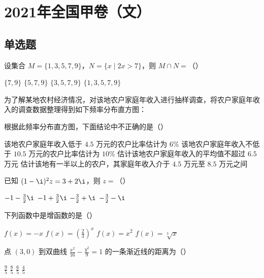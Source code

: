 \chapter{2021年全国甲卷（文）}

\section{单选题}

\begin{problem}
设集合 \(M=\{1,3,5,7,9\}\)，\(N=\{x\mid 2x>7\}\)，则 \(M\cap N=\)（\quad）

\choices
    {\(\{7,9\}\)}
    {\(\{5,7,9\}\)}
    {\(\{3,5,7,9\}\)}
    {\(\{1,3,5,7,9\}\)}

\end{problem}

\begin{problem}
为了解某地农村经济情况，对该地农户家庭年收入进行抽样调查，将农户家庭年收入的调查数据整理得到如下频率分布直方图：


根据此频率分布直方图，下面结论中不正确的是（\quad）

\choices
    {该地农户家庭年收入低于 \(4.5\) 万元的农户比率估计为 \(6\%\)}
    {该地农户家庭年收入不低于 \(10.5\) 万元的农户比率估计为 \(10\%\)}
    {估计该地农户家庭年收入的平均值不超过 \(6.5\) 万元}
    {估计该地有一半以上的农户，其家庭年收入介于 \(4.5\) 万元至 \(8.5\) 万元之间}

\end{problem}

\begin{problem}
已知 \((1-\i)^2z=3+2\i\)，则 \(z=\)（\quad）

\choices
    {\(-1-\frac{3}{2}\i\)}
    {\(-1+\frac{3}{2}\i\)}
    {\(-\frac{3}{2}+\i\)}
    {\(-\frac{3}{2}-\i\)}

\end{problem}

\begin{problem}
下列函数中是增函数的是（\quad）

\choices
    {\(f(x)=-x\)}
    {\(f(x)=\left(\frac{2}{3}\right)^x\)}
    {\(f(x)=x^2\)}
    {\(f(x)=\sqrt[3]{x}\)}

\end{problem}

\begin{problem}
点 \((3,0)\) 到双曲线 \(\frac{x^2}{16}-\frac{y^2}{9}=1\) 的一条渐近线的距离为（\quad）

\choices
    {\(\frac{9}{5}\)}
    {\(\frac{8}{5}\)}
    {\(\frac{6}{5}\)}
    {\(\frac{4}{5}\)}

\end{problem}

